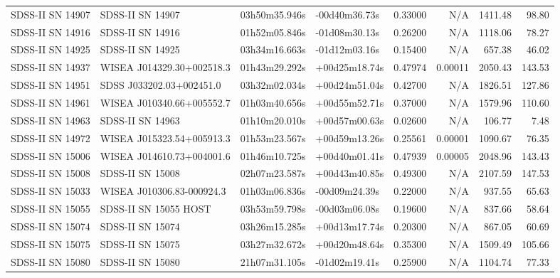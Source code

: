 \begin{longtable}{llllrrrr}
SDSS-II SN 14907 &                SDSS-II SN 14907 &   03h50m35.946s &   -00d40m36.73s &  0.33000 &      N/A &  1411.48 &       98.80 \\
SDSS-II SN 14916 &                SDSS-II SN 14916 &   01h52m05.846s &   -01d08m30.13s &  0.26200 &      N/A &  1118.06 &       78.27 \\
SDSS-II SN 14925 &                SDSS-II SN 14925 &   03h34m16.663s &   -01d12m03.16s &  0.15400 &      N/A &   657.38 &       46.02 \\
SDSS-II SN 14937 &       WISEA J014329.30+002518.3 &   01h43m29.292s &   +00d25m18.74s &  0.47974 &  0.00011 &  2050.43 &      143.53 \\
SDSS-II SN 14951 &        SDSS J033202.03+002451.0 &   03h32m02.034s &   +00d24m51.04s &  0.42700 &      N/A &  1826.51 &      127.86 \\
SDSS-II SN 14961 &       WISEA J010340.66+005552.7 &   01h03m40.656s &   +00d55m52.71s &  0.37000 &      N/A &  1579.96 &      110.60 \\
SDSS-II SN 14963 &                SDSS-II SN 14963 &   01h10m20.010s &   +00d57m00.63s &  0.02600 &      N/A &   106.77 &        7.48 \\
SDSS-II SN 14972 &       WISEA J015323.54+005913.3 &   01h53m23.567s &   +00d59m13.26s &  0.25561 &  0.00001 &  1090.67 &       76.35 \\
SDSS-II SN 15006 &       WISEA J014610.73+004001.6 &   01h46m10.725s &   +00d40m01.41s &  0.47939 &  0.00005 &  2048.96 &      143.43 \\
SDSS-II SN 15008 &                SDSS-II SN 15008 &   02h07m23.587s &   +00d43m40.85s &  0.49300 &      N/A &  2107.59 &      147.53 \\
SDSS-II SN 15033 &       WISEA J010306.83-000924.3 &   01h03m06.836s &   -00d09m24.39s &  0.22000 &      N/A &   937.55 &       65.63 \\
SDSS-II SN 15055 &           SDSS-II SN 15055 HOST &   03h53m59.798s &   -00d03m06.08s &  0.19600 &      N/A &   837.66 &       58.64 \\
SDSS-II SN 15074 &                SDSS-II SN 15074 &   03h26m15.285s &   +00d13m17.74s &  0.20300 &      N/A &   867.05 &       60.69 \\
SDSS-II SN 15075 &                SDSS-II SN 15075 &   03h27m32.672s &   +00d20m48.64s &  0.35300 &      N/A &  1509.49 &      105.66 \\
SDSS-II SN 15080 &                SDSS-II SN 15080 &   21h07m31.105s &   -01d02m19.41s &  0.25900 &      N/A &  1104.74 &       77.33 \\

\end{longtable}
